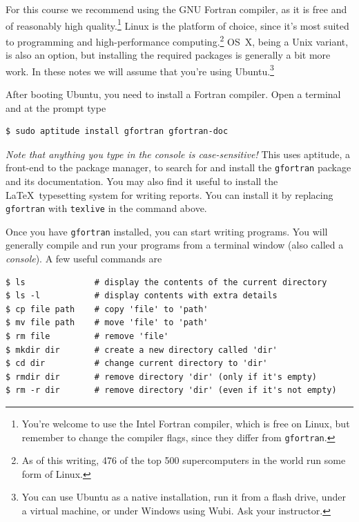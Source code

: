 \documentclass[openany,oneside]{report}
\begin{document}
For this course we recommend using the GNU Fortran compiler, as it is free and of reasonably high quality.\footnote{You're welcome to use the Intel Fortran compiler, which is free on Linux, but remember to change the compiler flags, since they differ from \texttt{gfortran}.} 
Linux is the platform of choice, since it's most suited to programming and high-performance computing.\footnote{As of this writing, 476 of the top 500 supercomputers in the world run some form of Linux.}
OS~X, being a Unix variant, is also an option, but installing the required packages is generally a bit more work.
In these notes we will assume that you're using Ubuntu.\footnote{You can use Ubuntu as a native installation, run it from a flash drive, under a virtual machine, or under Windows using Wubi.
Ask your instructor.}

After booting Ubuntu, you need to install a Fortran compiler.
Open a terminal and at the prompt type
\begin{verbatim}
$ sudo aptitude install gfortran gfortran-doc
\end{verbatim}
\emph{Note that anything you type in the console is case-sensitive!} 
This uses aptitude, a front-end to the package manager, to search for and install the \texttt{gfortran} package and its documentation.
You may also find it useful to install the \LaTeX\ typesetting system for writing reports.
You can install it by replacing \texttt{gfortran} with \texttt{texlive} in the command above.

Once you have \texttt{gfortran} installed, you can start writing programs.
You will generally compile and run your programs from a terminal window (also called a \emph{console}).
A few useful commands are
\begin{verbatim}
$ ls              # display the contents of the current directory
$ ls -l           # display contents with extra details
$ cp file path    # copy 'file' to 'path'
$ mv file path    # move 'file' to 'path'
$ rm file         # remove 'file'
$ mkdir dir       # create a new directory called 'dir'
$ cd dir          # change current directory to 'dir'
$ rmdir dir       # remove directory 'dir' (only if it's empty)
$ rm -r dir       # remove directory 'dir' (even if it's not empty)
\end{verbatim}
\end{document}
